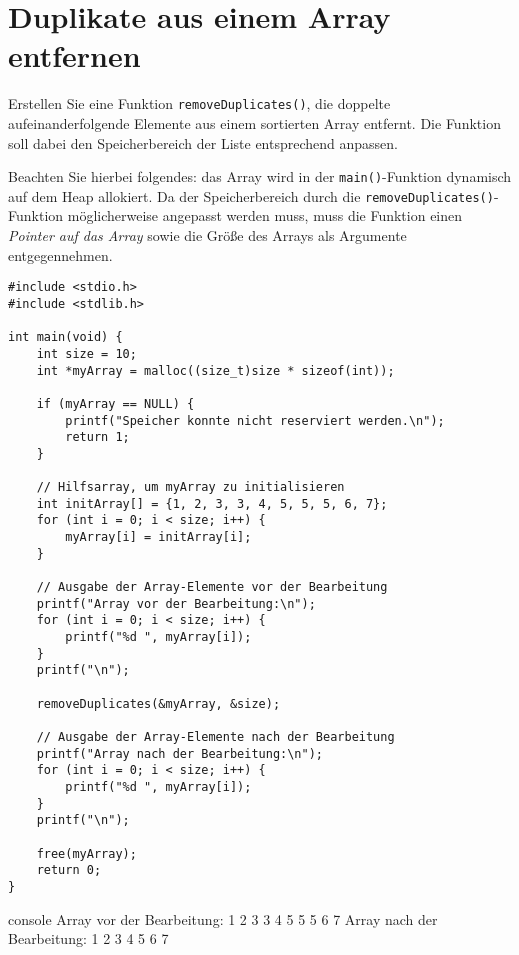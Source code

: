 \chapter{Duplikate aus einem Array entfernen}

\vspace{10pt}

Erstellen Sie eine Funktion \texttt{removeDuplicates()}, die doppelte
aufeinanderfolgende Elemente aus einem sortierten Array entfernt. Die Funktion
soll dabei den Speicherbereich der Liste entsprechend anpassen.

Beachten Sie hierbei folgendes: das Array wird in der
\texttt{main()}-Funktion dynamisch auf dem Heap allokiert. Da der
Speicherbereich durch die \texttt{removeDuplicates()}-Funktion
möglicherweise angepasst werden muss, muss die Funktion einen \textit{Pointer
auf das Array} sowie die Größe des Arrays als Argumente entgegennehmen.

\Vorlage
\begin{verbatim}
#include <stdio.h>
#include <stdlib.h>

int main(void) {
    int size = 10;
    int *myArray = malloc((size_t)size * sizeof(int));

    if (myArray == NULL) {
        printf("Speicher konnte nicht reserviert werden.\n");
        return 1;
    }

    // Hilfsarray, um myArray zu initialisieren
    int initArray[] = {1, 2, 3, 3, 4, 5, 5, 5, 6, 7};
    for (int i = 0; i < size; i++) {
        myArray[i] = initArray[i];
    }

    // Ausgabe der Array-Elemente vor der Bearbeitung
    printf("Array vor der Bearbeitung:\n");
    for (int i = 0; i < size; i++) {
        printf("%d ", myArray[i]);
    }
    printf("\n");

    removeDuplicates(&myArray, &size);

    // Ausgabe der Array-Elemente nach der Bearbeitung
    printf("Array nach der Bearbeitung:\n");
    for (int i = 0; i < size; i++) {
        printf("%d ", myArray[i]);
    }
    printf("\n");

    free(myArray);
    return 0;
}
\end{verbatim}

\begin{mybox}[Bildschirmausgabe]{console}
    Array vor der Bearbeitung:
    1 2 3 3 4 5 5 5 6 7
    Array nach der Bearbeitung:
    1 2 3 4 5 6 7
\end{mybox}
